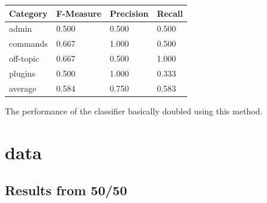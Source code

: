 \documentclass[12pt, a4paper]{article}
\begin{document}
\begin{table}[H]
    \centering
    \label{tab:5050}
    \begin{tabular}{llll}
    \hline
    Category    & F-Measure & Precision & Recall    \\
    \hline
    admin       & 0.500     & 0.500     & 0.500     \\
    commands    & 0.667     & 1.000     & 0.500     \\
    off-topic   & 0.667     & 0.500     & 1.000     \\
    plugins     & 0.500     & 1.000     & 0.333     \\
    average     & 0.584     & 0.750     & 0.583     \\
    \hline
    \end{tabular}
\end{table}

The performance of the classifier basically doubled using this method.

\newpage
\section{data}

\label{sec:5050}
\subsection{Results from 50/50}
\end{document}
